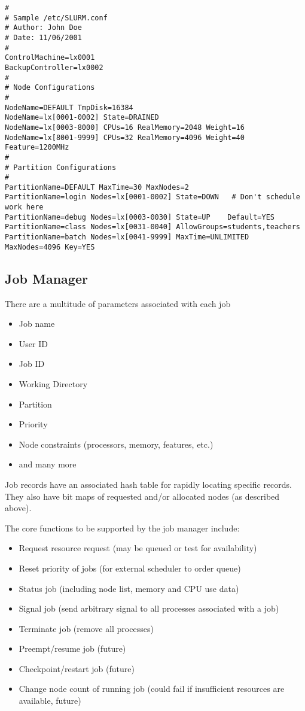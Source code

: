 \begin{verbatim}
# 
# Sample /etc/SLURM.conf
# Author: John Doe
# Date: 11/06/2001
#
ControlMachine=lx0001
BackupController=lx0002
#
# Node Configurations
#
NodeName=DEFAULT TmpDisk=16384
NodeName=lx[0001-0002] State=DRAINED
NodeName=lx[0003-8000] CPUs=16 RealMemory=2048 Weight=16
NodeName=lx[8001-9999] CPUs=32 RealMemory=4096 Weight=40 Feature=1200MHz
#
# Partition Configurations
#
PartitionName=DEFAULT MaxTime=30 MaxNodes=2
PartitionName=login Nodes=lx[0001-0002] State=DOWN   # Don't schedule work here
PartitionName=debug Nodes=lx[0003-0030] State=UP    Default=YES
PartitionName=class Nodes=lx[0031-0040] AllowGroups=students,teachers
PartitionName=batch Nodes=lx[0041-9999] MaxTime=UNLIMITED MaxNodes=4096 Key=YES
\end{verbatim}

\subsection{Job Manager}

There are a multitude of parameters associated with each job
\begin{itemize}
\item Job name
\item User ID
\item Job ID
\item Working Directory
\item Partition
\item Priority
\item Node constraints (processors, memory, features, etc.)
\item and many more
\end{itemize}

Job records have an associated hash table for rapidly locating 
specific records. They also have bit maps of requested and/or 
allocated nodes (as described above).

The core functions to be supported by the job manager include:
\begin{itemize}
\item Request resource request (may be queued or test for availability)
\item Reset priority of jobs (for external scheduler to order queue)
\item Status job (including node list, memory and CPU use data)
\item Signal job (send arbitrary signal to all processes associated with a job)
\item Terminate job (remove all processes)
\item Preempt/resume job  (future)
\item Checkpoint/restart job (future)
\item Change node count of running job (could fail if insufficient resources are 
available, future)
\end{itemize}

